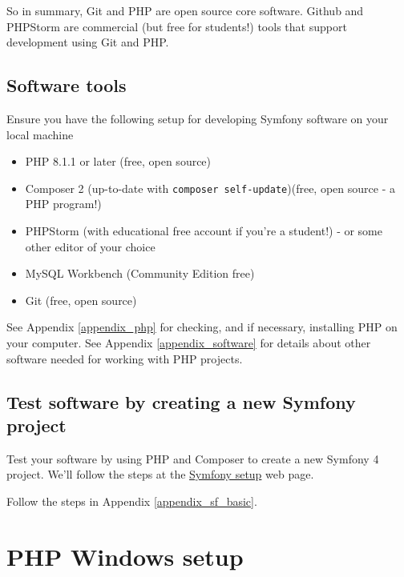\documentclass[a4paperpaper,openright]{book}
\providecommand{\tightlist}{%
  \setlength{\itemsep}{0pt}\setlength{\parskip}{0pt}}
\begin{document}
So in summary, Git and PHP are open source core software. Github and
PHPStorm are commercial (but free for students!) tools that support
development using Git and PHP.

\hypertarget{software-tools}{%
\section{Software tools}\label{software-tools}}

Ensure you have the following setup for developing Symfony software on
your local machine

\begin{itemize}
\tightlist
\item
  PHP 8.1.1 or later (free, open source)
\item
  Composer 2 (up-to-date with \texttt{composer\ self-update})(free, open
  source - a PHP program!)
\item
  PHPStorm (with educational free account if you're a student!) - or
  some other editor of your choice
\item
  MySQL Workbench (Community Edition free)
\item
  Git (free, open source)
\end{itemize}

See Appendix \ref{appendix_php} for checking, and if necessary,
installing PHP on your computer. See Appendix \ref{appendix_software}
for details about other software needed for working with PHP projects.

\hypertarget{test-software-by-creating-a-new-symfony-project}{%
\section{Test software by creating a new Symfony
project}\label{test-software-by-creating-a-new-symfony-project}}

Test your software by using PHP and Composer to create a new Symfony 4
project. We'll follow the steps at the
\href{https://symfony.com/doc/current/setup.html}{Symfony setup} web
page.

Follow the steps in Appendix \ref{appendix_sf_basic}.

\hypertarget{php-windows-setup}{%
\chapter{\texorpdfstring{PHP Windows
setup\label{appendix_php}}{PHP Windows setup}}\label{php-windows-setup}}
\end{document}
